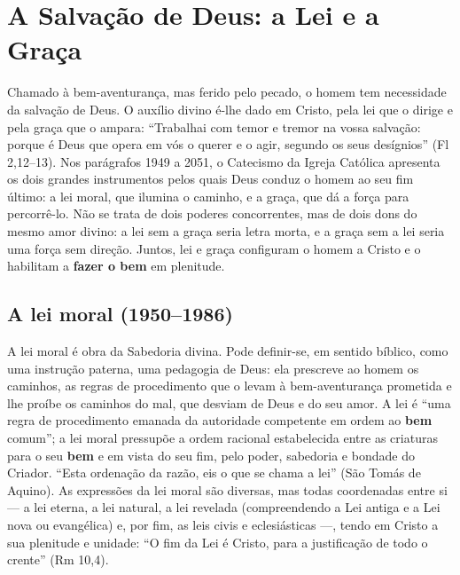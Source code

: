 \chapter{A Salvação de Deus: a Lei e a Graça}

Chamado à bem-aventurança, mas ferido pelo pecado, o homem tem necessidade da salvação de Deus. O auxílio divino é-lhe dado em Cristo, pela lei que o dirige e pela graça que o ampara: ``Trabalhai com temor e tremor na vossa salvação: porque é Deus que opera em vós o querer e o agir, segundo os seus desígnios'' (Fl 2,12--13). Nos parágrafos 1949 a 2051, o Catecismo da Igreja Católica apresenta os dois grandes instrumentos pelos quais Deus conduz o homem ao seu fim último: a lei moral, que ilumina o caminho, e a graça, que dá a força para percorrê-lo. Não se trata de dois poderes concorrentes, mas de dois dons do mesmo amor divino: a lei sem a graça seria letra morta, e a graça sem a lei seria uma força sem direção. Juntos, lei e graça configuram o homem a Cristo e o habilitam a \textbf{fazer o bem} em plenitude.

\section{A lei moral (1950--1986)}

A lei moral é obra da Sabedoria divina. Pode definir-se, em sentido bíblico, como uma instrução paterna, uma pedagogia de Deus: ela prescreve ao homem os caminhos, as regras de procedimento que o levam à bem-aventurança prometida e lhe proíbe os caminhos do mal, que desviam de Deus e do seu amor. A lei é ``uma regra de procedimento emanada da autoridade competente em ordem ao \textbf{bem} comum''; a lei moral pressupõe a ordem racional estabelecida entre as criaturas para o seu \textbf{bem} e em vista do seu fim, pelo poder, sabedoria e bondade do Criador. ``Esta ordenação da razão, eis o que se chama a lei'' (São Tomás de Aquino). As expressões da lei moral são diversas, mas todas coordenadas entre si --- a lei eterna, a lei natural, a lei revelada (compreendendo a Lei antiga e a Lei nova ou evangélica) e, por fim, as leis civis e eclesiásticas ---, tendo em Cristo a sua plenitude e unidade: ``O fim da Lei é Cristo, para a justificação de todo o crente'' (Rm 10,4).

